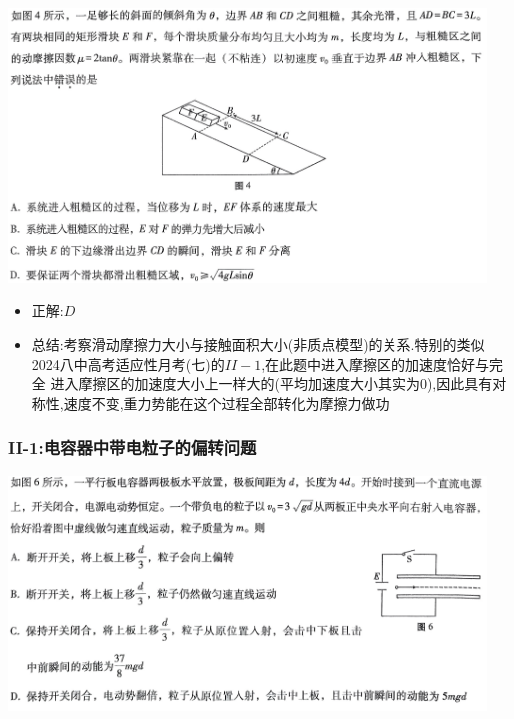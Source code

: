 \documentclass{article}
\begin{document}
\includegraphics[width=0.95\textwidth,keepaspectratio]{./pictures/3.4-1.png}

\begin{itemize}
    \item 正解:\quad $D$
    \item 总结:\quad 考察滑动摩擦力大小与接触面积大小(非质点模型)的关系.特别的类似2024八中高考适应性月考(七)的$II-1$,在此题中进入摩擦区的加速度恰好与完全
          进入摩擦区的加速度大小上一样大的(平均加速度大小其实为$0$),因此具有对称性,速度不变,重力势能在这个过程全部转化为摩擦力做功
\end{itemize}

\vspace{2em}

\subsubsection{II-1:电容器中带电粒子的偏转问题}

\includegraphics[width=0.95\textwidth,keepaspectratio]{./pictures/3.4-4.png}
\end{document}
